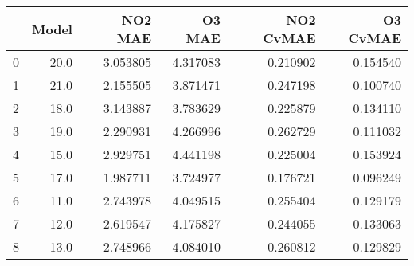 \begin{tabular}{lrrrrr}
\toprule
{} &  Model &   NO2 MAE &    O3 MAE &  NO2 CvMAE &  O3 CvMAE \\
\midrule
0 &   20.0 &  3.053805 &  4.317083 &   0.210902 &  0.154540 \\
1 &   21.0 &  2.155505 &  3.871471 &   0.247198 &  0.100740 \\
2 &   18.0 &  3.143887 &  3.783629 &   0.225879 &  0.134110 \\
3 &   19.0 &  2.290931 &  4.266996 &   0.262729 &  0.111032 \\
4 &   15.0 &  2.929751 &  4.441198 &   0.225004 &  0.153924 \\
5 &   17.0 &  1.987711 &  3.724977 &   0.176721 &  0.096249 \\
6 &   11.0 &  2.743978 &  4.049515 &   0.255404 &  0.129179 \\
7 &   12.0 &  2.619547 &  4.175827 &   0.244055 &  0.133063 \\
8 &   13.0 &  2.748966 &  4.084010 &   0.260812 &  0.129829 \\
\bottomrule
\end{tabular}
